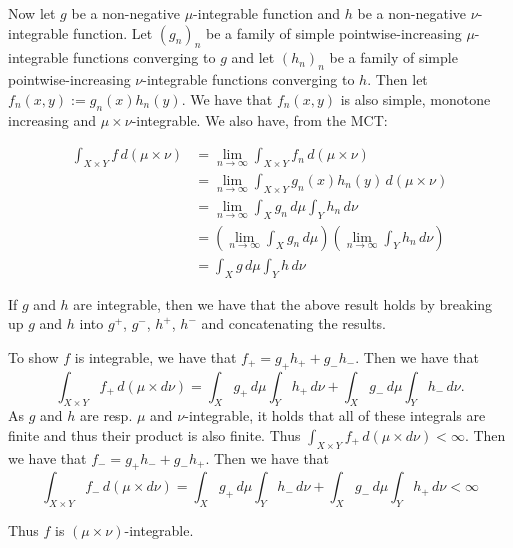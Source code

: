 \documentclass{article}
\theoremstyle{definition}
\numberwithin{theorem}{section}
\numberwithin{equation}{section}
\begin{document}
Now let $g$ be a non-negative $\mu$-integrable function and $h$ be a non-negative $\nu$-integrable function. Let $(g_n)_n$ be a family of simple pointwise-increasing $\mu$-integrable functions converging to $g$ and let  $(h_n)_n$ be a family of simple pointwise-increasing $\nu$-integrable functions converging to $h$. Then let $f_n(x, y) := g_n(x) h_n(y)$. We have that $f_n(x, y)$ is also simple, monotone increasing and $\mu \times \nu$-integrable. We also have, from the MCT:

\begin{align*}
	\int_{X \times Y} f \, d(\mu \times \nu) &= \lim_{n \rightarrow \infty} \int_{X \times Y} f_n \, d(\mu \times \nu)\\
	&= \lim_{n \rightarrow \infty} \int_{X \times Y} g_n(x) h_n(y) \, d(\mu \times \nu)\\
	&= \lim_{n \rightarrow \infty} \int_X g_n \, d\mu \int_Y h_n \, d\nu\\
	&= \left(\lim_{n \rightarrow \infty} \int_X g_n \, d\mu\right) \left(\lim_{n \rightarrow \infty}\int_Y h_n \, d\nu\right)\\
	&= \int_X g \, d\mu \int_Y h \, d\nu
\end{align*}

If $g$ and $h$ are integrable, then we have that the above result holds by breaking up $g$ and $h$ into $g^+$, $g^-$, $h^+$, $h^-$ and concatenating the results. 

To show $f$ is integrable, we have that $f_+ = g_+ h_+ + g_- h_-$. Then we have that 
\begin{equation}
	\int_{X \times Y} f_+ \, d(\mu \times d\nu) = \int_X g_+ \, d\mu \int_Y h_+ \, d\nu +  \int_X g_- \, d\mu \int_Y h_- \, d\nu.
\end{equation}
As $g$ and $h$ are resp. $\mu$ and $\nu$-integrable, it holds that all of these integrals are finite and thus their product is also finite. Thus $\int_{X \times Y} f_+ \, d(\mu \times d\nu) < \infty$. Then we have that $f_- = g_+ h_- + g_- h_+$. Then we have that
\begin{equation}
	\int_{X \times Y} f_- \, d(\mu \times d\nu) = \int_X g_+ \, d\mu \int_Y h_- \, d\nu +  \int_X g_- \, d\mu \int_Y h_+ \, d\nu < \infty
\end{equation}

Thus $f$ is $(\mu \times \nu)$-integrable. 
\end{document}
